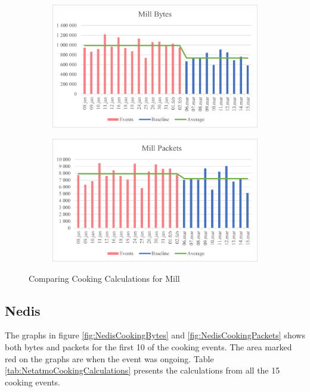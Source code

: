 \begin{figure}[H]
    \centering
    \begin{subfigure}{0.49\textwidth}
        \centering
        \includegraphics[width=1\hsize]{figures/Mill_Comparing_Cooking_Calculations_Bytes.png} 
    \end{subfigure}
    \begin{subfigure}{0.49\textwidth}
        \centering
        \includegraphics[width=1\hsize]{figures/Mill_Comparing_Cooking_Calculations_Packets.png} 
    \end{subfigure}
    \caption{Comparing Cooking Calculations for Mill}
    \label{fig:MillComparingCookingCalc
    ulations}
\end{figure}

\newpage
\subsection{Nedis}
The graphs in figure \ref{fig:NedisCookingBytes} and \ref{fig:NedisCookingPackets} shows both bytes and packets for the first 10 of the cooking events. The area marked red on the graphs are when the event was ongoing. Table \ref{tab:NetatmoCookingCalculations} presents the calculations from all the 15 cooking events. 



